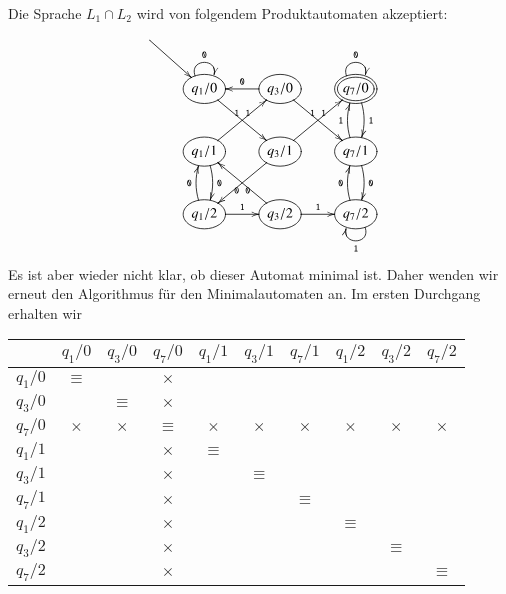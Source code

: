 \begin{loesung}
\begin{teilaufgaben}
\item
Die Sprache $L_1\cap L_2$ wird von folgendem Produktautomaten akzeptiert:
\[
\entrymodifiers={++[o][F]}
\xymatrix{
*+\txt{}\ar[dr]
\\
*+\txt{}
        &{q_1/0} \ar@(ul,ur)^{\tt 0} \ar[dr]^{\tt 1}
                &{q_3/0} \ar[l]_{\tt 0} \ar[dr]^{\tt 1}
                        &*++[o][F=]{q_7/0} \ar@(ul,ur)^{\tt 0} \ar@/^/[d]^{\tt 1}
\\
*+\txt{}
        &{q_1/1} \ar@/^/[d]^{\tt 0} \ar[ur]^{\tt 1}
                &{q_3/1} \ar[dl]^{\tt 0} \ar[ur]^{\tt 1}
                        &{q_7/1} \ar@/^/[d]^{\tt 0} \ar@/^/[u]^{\tt 1}
\\
*+\txt{}
        &{q_1/2} \ar@/^/[u]^{\tt 0} \ar[r]^{\tt 1}
                &{q_3/2} \ar[ul]^{\tt 0} \ar[r]^{\tt 1}
                        &{q_7/2} \ar@/^/[u]^{\tt 0} \ar@(dr,dl)^{\tt 1}
\\
}
\]
Es ist aber wieder nicht klar, ob dieser Automat minimal ist. Daher
wenden wir erneut den Algorithmus für den Minimalautomaten an. Im
ersten Durchgang erhalten wir
\begin{center}
\begin{tabular}{|c|ccccccccc|}
\hline
         &$q_1/0$  &$q_3/0$  &$q_7/0$  &$q_1/1$  &$q_3/1$  &$q_7/1$  &$q_1/2$  &$q_3/2$  &$q_7/2$  \\
\hline
$q_1/0$  &$\equiv$ &         &$\times$ &         &         &         &         &         &         \\
$q_3/0$  &         &$\equiv$ &$\times$ &         &         &         &         &         &         \\
$q_7/0$  &$\times$ &$\times$ &$\equiv$ &$\times$ &$\times$ &$\times$ &$\times$ &$\times$ &$\times$ \\
$q_1/1$  &         &         &$\times$ &$\equiv$ &         &         &         &         &         \\
$q_3/1$  &         &         &$\times$ &         &$\equiv$ &         &         &         &         \\
$q_7/1$  &         &         &$\times$ &         &         &$\equiv$ &         &         &         \\
$q_1/2$  &         &         &$\times$ &         &         &         &$\equiv$ &         &         \\
$q_3/2$  &         &         &$\times$ &         &         &         &         &$\equiv$ &         \\
$q_7/2$  &         &         &$\times$ &         &         &         &         &         &$\equiv$ \\

\end{tabular}
\end{center}
\end{teilaufgaben}
\end{loesung}
